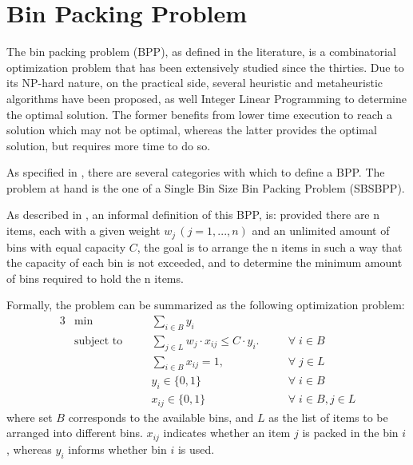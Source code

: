 \chapter{Bin Packing Problem} \label{chap:literature review}

The bin packing problem (BPP), as defined in the literature, is a combinatorial
optimization problem that has been extensively studied since the thirties. Due
to its NP-hard nature, on the practical side, several heuristic and
metaheuristic algorithms have been proposed, as well Integer Linear Programming
to determine the optimal solution. The former benefits from lower time execution
to reach a solution which may not be optimal, whereas the latter provides the
optimal solution, but requires more time to do so.

As specified in \cite{wascher2007improved}, there are several categories with
which to define a BPP. The problem at hand is the one of a Single Bin Size Bin
Packing Problem (SBSBPP).

As described in \cite{delorme2016bin}, an informal definition of this BPP, is:
provided there are n items, each with a given weight \( w_j  \, (j = 1, ..., n)
\) and an unlimited amount of bins with equal capacity \( C \), the goal is to
arrange the n items in such a way that the capacity of each bin is not exceeded,
and to determine the minimum amount of bins required to hold the n items.

Formally, the problem can be summarized as the following optimization problem:
\begin{alignat}{3}
\label{BPP model}
    &\min       &&\sum_{i \in B} y_i && \\
    &\text{subject to} \quad
                && \sum_{j \in L} w_j \cdot x_{ij} \leq C \cdot y_i. \quad      && \forall \; i \in B \label{opt:c1} \\
    &           && \sum_{i \in B} x_{ij} = 1, \quad                 && \forall \; j \in L \label{opt:c2} \\
    &           && y_i \in \{0, 1\}                                 && \forall \; i \in B \\
    &           && x_{ij} \in \{0,1\}                               && \forall \; i \in B, j \in L
\end{alignat}
where set $B$ corresponds to the available bins, and $L$ as the list of items to
be arranged into different bins. $x_{ij}$ indicates whether an item $j$ is
packed in the bin $i$, whereas $y_i$ informs whether bin $i$ is used. 

